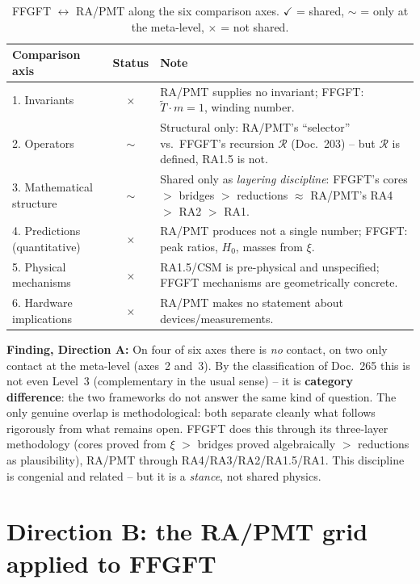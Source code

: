 \begin{table}[htbp]
\centering
\caption{FFGFT $\leftrightarrow$ RA/PMT along the six comparison axes.
$\checkmark$ = shared, $\sim$ = only at the meta-level, $\times$ = not shared.}
\label{tab:directionA}
\begin{tabular}{p{6.5cm}c p{4cm}}
\toprule
\textbf{Comparison axis} & \textbf{Status} & \textbf{Note} \\
\midrule
1. Invariants          & $\times$ &
  RA/PMT supplies no invariant; FFGFT: $\tilde{T}\cdot m=1$, winding number. \\
2. Operators           & $\sim$ &
  Structural only: RA/PMT's ``selector'' vs.\ FFGFT's recursion
  $\mathcal{R}$ (Doc.~203) -- but $\mathcal{R}$ is defined, RA1.5 is not. \\
3. Mathematical structure & $\sim$ &
  Shared only as \emph{layering discipline}: FFGFT's cores $>$ bridges
  $>$ reductions $\approx$ RA/PMT's RA4 $>$ RA2 $>$ RA1. \\
4. Predictions (quantitative) & $\times$ &
  RA/PMT produces not a single number; FFGFT: peak ratios, $H_0$,
  masses from $\xi$. \\
5. Physical mechanisms & $\times$ &
  RA1.5/CSM is pre-physical and unspecified; FFGFT mechanisms are
  geometrically concrete. \\
6. Hardware implications & $\times$ &
  RA/PMT makes no statement about devices/measurements. \\
\bottomrule
\end{tabular}
\end{table}

\textbf{Finding, Direction A:} On four of six axes there is \emph{no}
contact, on two only contact at the meta-level (axes~2 and~3). By the
classification of Doc.~265 this is not even Level~3 (complementary in the
usual sense) -- it is \textbf{category difference}: the two frameworks do
not answer the same kind of question. The only genuine overlap is
methodological: both separate cleanly what follows rigorously from what
remains open. FFGFT does this through its three-layer methodology (cores
proved from $\xi$ $>$ bridges proved algebraically $>$ reductions as
plausibility), RA/PMT through RA4/RA3/RA2/RA1.5/RA1. This discipline is
congenial and related -- but it is a \emph{stance}, not shared physics.

\section{Direction B: the RA/PMT grid applied to FFGFT}

